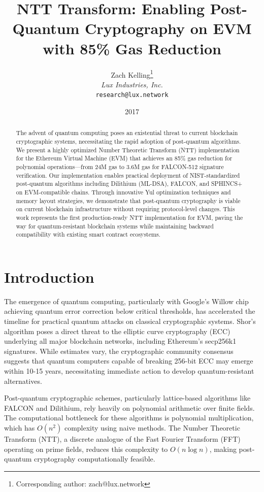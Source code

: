 \documentclass[11pt,a4paper]{article}
\title{NTT Transform: Enabling Post-Quantum Cryptography on EVM\\with 85\% Gas Reduction}
\author{
Zach Kelling\thanks{Corresponding author: zach@lux.network}\\
\textit{Lux Industries, Inc.}\\
\texttt{research@lux.network}
}
\date{2017}
\begin{document}
\luxcoverpage

\begin{abstract}
The advent of quantum computing poses an existential threat to current blockchain cryptographic systems, necessitating the rapid adoption of post-quantum algorithms. We present a highly optimized Number Theoretic Transform (NTT) implementation for the Ethereum Virtual Machine (EVM) that achieves an 85\% gas reduction for polynomial operations—from 24M gas to 3.6M gas for FALCON-512 signature verification. Our implementation enables practical deployment of NIST-standardized post-quantum algorithms including Dilithium (ML-DSA), FALCON, and SPHINCS+ on EVM-compatible chains. Through innovative Yul optimization techniques and memory layout strategies, we demonstrate that post-quantum cryptography is viable on current blockchain infrastructure without requiring protocol-level changes. This work represents the first production-ready NTT implementation for EVM, paving the way for quantum-resistant blockchain systems while maintaining backward compatibility with existing smart contract ecosystems.
\end{abstract}

\section{Introduction}

The emergence of quantum computing, particularly with Google's Willow chip achieving quantum error correction below critical thresholds, has accelerated the timeline for practical quantum attacks on classical cryptographic systems. Shor's algorithm poses a direct threat to the elliptic curve cryptography (ECC) underlying all major blockchain networks, including Ethereum's secp256k1 signatures. While estimates vary, the cryptographic community consensus suggests that quantum computers capable of breaking 256-bit ECC may emerge within 10-15 years, necessitating immediate action to develop quantum-resistant alternatives.

Post-quantum cryptographic schemes, particularly lattice-based algorithms like FALCON and Dilithium, rely heavily on polynomial arithmetic over finite fields. The computational bottleneck for these algorithms is polynomial multiplication, which has $O(n^2)$ complexity using naive methods. The Number Theoretic Transform (NTT), a discrete analogue of the Fast Fourier Transform (FFT) operating on prime fields, reduces this complexity to $O(n \log n)$, making post-quantum cryptography computationally feasible.
\end{document}
